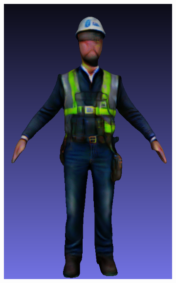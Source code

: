 \begin{figure}[H]
    \begin{subfigure}[b]{0.2\textwidth}
        \centering
        \includegraphics[width=\textwidth]{figures/future/bias_engineer_genie_1.png}
        \caption{}
    \end{subfigure}
    \begin{subfigure}[b]{0.2567\textwidth}
        \centering

\end{subfigure}
\end{figure}
